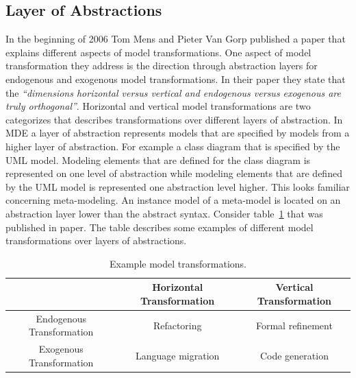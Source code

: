 \subsection{Layer of Abstractions}
\label{sec:abstraction_layer}

In the beginning of 2006 Tom Mens and Pieter Van Gorp published a
paper\cite{Mens2006} that explains different aspects of model transformations.
One aspect of model transformation they address is the direction through
abstraction layers for endogenous and exogenous model transformations. In their
paper they state that the \textit{``dimensions horizontal versus vertical and
endogenous versus exogenous are truly orthogonal''}\cite{Mens2006}. Horizontal
and vertical model transformations are two categorizes that describes
transformations over different layers of abstraction. In MDE a layer of
abstraction represents models that are specified by models from a higher layer
of abstraction. For example a class diagram that is specified by the UML model.
Modeling elements that are defined for the class diagram is represented on one
level of abstraction while modeling elements that are defined by the UML model
is represented one abstraction level higher. This looks familiar concerning
meta-modeling. An instance model of a meta-model is located on an abstraction
layer lower than the abstract syntax. Consider table~\ref{tab:directions_mt}
that was published in paper\cite{Mens2006}. The table describes some examples
of different model transformations over layers of abstractions.

\begin{table}[ht]
\renewcommand*\arraystretch{1.2}
\centering
\begin{tabular}{| c | c | c |}
\hline

& Horizontal Transformation & Vertical Transformation \\ [0.5ex] 
\hline
Endogenous Transformation & Refactoring & Formal refinement \\ [0.5ex] 
Exogenous Transformation & Language migration & Code generation \\ [0.5ex]
 
\hline
\end{tabular}
\caption{Example model transformations.}
\label{tab:directions_mt}
\end{table} 


